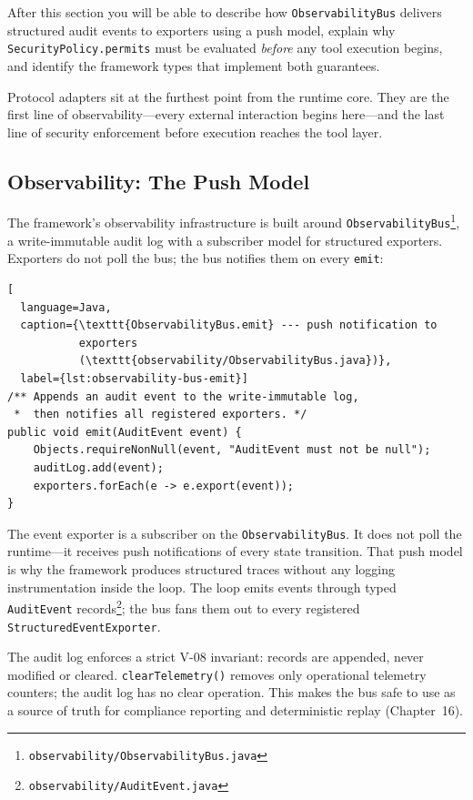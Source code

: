 \begin{learningbox}
After this section you will be able to describe how
\lstinline{ObservabilityBus} delivers structured audit events to
exporters using a push model, explain why
\lstinline{SecurityPolicy.permits} must be evaluated
\emph{before} any tool execution begins, and identify the
framework types that implement both guarantees.
\end{learningbox}

Protocol adapters sit at the furthest point from the runtime core.
They are the first line of observability---every external interaction
begins here---and the last line of security enforcement before
execution reaches the tool layer.

\subsection{Observability: The Push Model}
\label{subsec:observability-push}

The framework's observability infrastructure is built around
\lstinline{ObservabilityBus}\footnote{\texttt{observability/ObservabilityBus.java}},
a write-immutable audit log with a subscriber model for structured
exporters.  Exporters do not poll the bus; the bus notifies them on
every \lstinline{emit}:

\begin{lstlisting}[
  language=Java,
  caption={\texttt{ObservabilityBus.emit} --- push notification to
           exporters
           (\texttt{observability/ObservabilityBus.java})},
  label={lst:observability-bus-emit}]
/** Appends an audit event to the write-immutable log,
 *  then notifies all registered exporters. */
public void emit(AuditEvent event) {
    Objects.requireNonNull(event, "AuditEvent must not be null");
    auditLog.add(event);
    exporters.forEach(e -> e.export(event));
}
\end{lstlisting}

The event exporter is a subscriber on the
\lstinline{ObservabilityBus}.  It does not poll the runtime---it
receives push notifications of every state transition.  That push
model is why the framework produces structured traces without any
logging instrumentation inside the loop.  The loop emits events
through typed \lstinline{AuditEvent}
records\footnote{\texttt{observability/AuditEvent.java}}; the bus
fans them out to every registered
\lstinline{StructuredEventExporter}.

The audit log enforces a strict V-08 invariant: records are
appended, never modified or cleared.
\lstinline{clearTelemetry()} removes only operational telemetry
counters; the audit log has no clear operation.  This makes the bus
safe to use as a source of truth for compliance reporting and
deterministic replay (Chapter~16).


